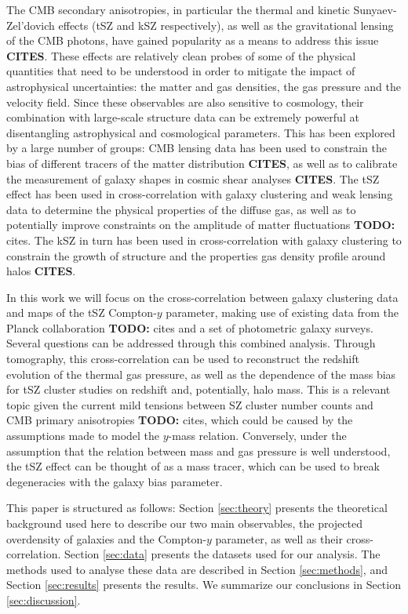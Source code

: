 \documentclass[useAMS,usenatbib]{mn2e}
\newcommand{\cites}{{\bf CITES}}
\newcommand{\todo}[1]{{\bf TODO:} #1}
\begin{document}
  The CMB secondary anisotropies, in particular the thermal and kinetic Sunyaev-Zel'dovich effects (tSZ and kSZ respectively), as well as the gravitational lensing of the CMB photons, have gained popularity as a means to address this issue \cites. These effects are relatively clean probes of some of the physical quantities that need to be understood in order to mitigate the impact of astrophysical uncertainties: the matter and gas densities, the gas pressure and the velocity field. Since these observables are also sensitive to cosmology, their combination with large-scale structure data can be extremely powerful at disentangling astrophysical and cosmological parameters. This has been explored by a large number of groups: CMB lensing data has been used to constrain the bias of different tracers of the matter distribution \cites, as well as to calibrate the measurement of galaxy shapes in cosmic shear analyses \cites. The tSZ effect has been used in cross-correlation with galaxy clustering and weak lensing data to determine the physical properties of the diffuse gas, as well as to potentially improve constraints on the amplitude of matter fluctuations \todo{cites}. The kSZ in turn has been used in cross-correlation with galaxy clustering to constrain the growth of structure and the properties gas density profile around halos \cites.
  
  In this work we will focus on the cross-correlation between galaxy clustering data and maps of the tSZ Compton-$y$ parameter, making use of existing data from the Planck collaboration \todo{cites} and a set of photometric galaxy surveys. Several questions can be addressed through this combined analysis. Through tomography, this cross-correlation can be used to reconstruct the redshift evolution of the thermal gas pressure, as well as the dependence of the mass bias for tSZ cluster studies on redshift and, potentially, halo mass. This is a relevant topic given the current mild tensions between SZ cluster number counts and CMB primary anisotropies \todo{cites}, which could be caused by the assumptions made to model the $y$-mass relation. Conversely, under the assumption that the relation between mass and gas pressure is well understood, the tSZ effect can be thought of as a mass tracer, which can be used to break degeneracies with the galaxy bias parameter.

  This paper is structured as follows: Section \ref{sec:theory} presents the theoretical background used here to describe our two main observables, the projected overdensity of galaxies and the Compton-$y$ parameter, as well as their cross-correlation. Section \ref{sec:data} presents the datasets used for our analysis. The methods used to analyse these data are described in Section \ref{sec:methods}, and Section \ref{sec:results} presents the results. We summarize our conclusions in Section \ref{sec:discussion}.
\end{document}
